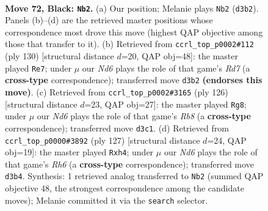 \documentclass[11pt]{article}
\begin{document}
\clearpage

\begin{figure}[p]\centering
\begin{subfigure}{0.46\textwidth}\centering
\resizebox{\linewidth}{!}{%
\newchessgame
\chessboard[
  setfen={8/1p2R2p/1k4pP/5p2/p4P2/3n2K1/8/8 b - - 1 72},
  showmover=false,
  pgfstyle=straightmove, color=movearrow, markmove={d3-b2}
]}
\caption{}
\end{subfigure}\hfill
\begin{subfigure}{0.46\textwidth}\centering
\resizebox{\linewidth}{!}{%
\newchessgame
\chessboard[
  setfen={6k1/3R1p2/7p/5P2/6PK/5r1P/8/8 w - - 3 66},
  showmover=false,
  pgfstyle=straightmove, color=movearrow, markmove={d7-e7}
]}
\caption{}
\end{subfigure}
\\[4pt]
\begin{subfigure}{0.46\textwidth}\centering
\resizebox{\linewidth}{!}{%
\newchessgame
\chessboard[
  setfen={1R6/8/3P1k2/2K3pp/5p2/7P/3r2P1/8 w - - 1 64},
  showmover=false,
  pgfstyle=straightmove, color=movearrow, markmove={b8-g8}
]}
\caption{}
\end{subfigure}\hfill
\begin{subfigure}{0.46\textwidth}\centering
\resizebox{\linewidth}{!}{%
\newchessgame
\chessboard[
  setfen={8/5pk1/3R2p1/1P5p/1K3P1P/7r/8/8 b - - 8 64},
  showmover=false,
  pgfstyle=straightmove, color=movearrow, markmove={h3-h4}
]}
\caption{}
\end{subfigure}
\caption{\textbf{Move 72, Black: \texttt{Nb2}.} (a) Our position; Melanie plays \texttt{Nb2} (\texttt{d3b2}). Panels (b)--(d) are the retrieved master positions whose correspondence most drove this move (highest QAP objective among those that transfer to it). (b) Retrieved from \texttt{ccrl\_top\_p0002\#112} (ply 130) [structural distance $d$=20, QAP obj=48]: the master played \texttt{Re7}; under $\mu$ our \emph{Nd6} plays the role of that game's \emph{Rd7} (a \textbf{cross-type} correspondence); transferred move \texttt{d3b2} \textbf{(endorses this move)}. (c) Retrieved from \texttt{ccrl\_top\_p0002\#3165} (ply 126) [structural distance $d$=23, QAP obj=27]: the master played \texttt{Rg8}; under $\mu$ our \emph{Nd6} plays the role of that game's \emph{Rb8} (a \textbf{cross-type} correspondence); transferred move \texttt{d3c1}. (d) Retrieved from \texttt{ccrl\_top\_p0000\#3892} (ply 127) [structural distance $d$=24, QAP obj=19]: the master played \texttt{Rxh4}; under $\mu$ our \emph{Nd6} plays the role of that game's \emph{Rh6} (a \textbf{cross-type} correspondence); transferred move \texttt{d3b4}. Synthesis: 1 retrieved analog transferred to \texttt{Nb2} (summed QAP objective 48, the strongest correspondence among the candidate moves); Melanie committed it via the \texttt{search} selector.}
\label{fig:thought-m143}
\end{figure}
\end{document}
